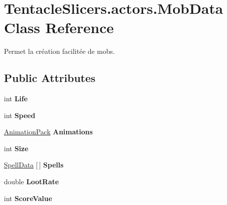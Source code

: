 \hypertarget{class_tentacle_slicers_1_1actors_1_1_mob_data}{}\section{Tentacle\+Slicers.\+actors.\+Mob\+Data Class Reference}
\label{class_tentacle_slicers_1_1actors_1_1_mob_data}


Permet la création facilitée de mobs.  


\subsection*{Public Attributes}
\begin{DoxyCompactItemize}
\item 
\mbox{\label{class_tentacle_slicers_1_1actors_1_1_mob_data_a92df41fc3b1ce918d6d73f366dfcaf46}} 
int {\bfseries Life}
\item 
\mbox{\label{class_tentacle_slicers_1_1actors_1_1_mob_data_af7644187a1c47cb332e3695b980dde78}} 
int {\bfseries Speed}
\item 
\mbox{\label{class_tentacle_slicers_1_1actors_1_1_mob_data_a733ffbf46f73fab352910314e44424d5}} 
\hyperlink{class_tentacle_slicers_1_1graphics_1_1_animation_pack}{Animation\+Pack} {\bfseries Animations}
\item 
\mbox{\label{class_tentacle_slicers_1_1actors_1_1_mob_data_a89499f7f652a451fb5d4bef025100b64}} 
int {\bfseries Size}
\item 
\mbox{\label{class_tentacle_slicers_1_1actors_1_1_mob_data_a81b468e37a59ab29aa4311af70ecf060}} 
\hyperlink{class_tentacle_slicers_1_1spells_1_1_spell_data}{Spell\+Data} \mbox{[}$\,$\mbox{]} {\bfseries Spells}
\item 
\mbox{\label{class_tentacle_slicers_1_1actors_1_1_mob_data_abb13e9de6be19149484ec7dff816080e}} 
double {\bfseries Loot\+Rate}
\item 
\mbox{\label{class_tentacle_slicers_1_1actors_1_1_mob_data_a11b6d5961ba79569634ea253cf77777d}} 
int {\bfseries Score\+Value}
\end{DoxyCompactItemize}


